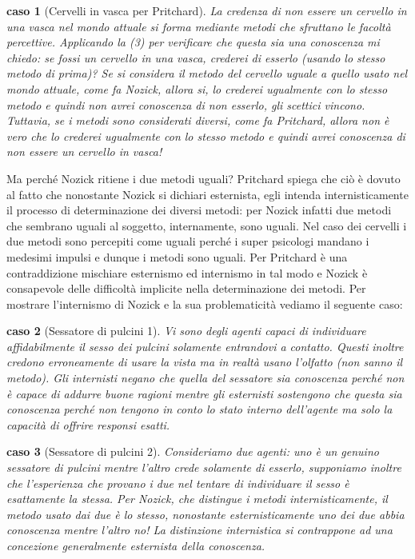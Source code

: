 \documentclass[10pt,a4paper]{article}
\newtheorem{caso}{caso}
\begin{document}
\begin{caso}[Cervelli in vasca per Pritchard]
	La credenza di non essere un cervello in una vasca nel mondo attuale si forma mediante metodi che sfruttano le facoltà percettive. Applicando la (3) per verificare che questa sia una conoscenza mi chiedo: se fossi un cervello in una vasca, crederei di esserlo (usando lo stesso metodo di prima)? Se si considera il metodo del cervello uguale a quello usato nel mondo attuale, come fa Nozick, allora si, lo crederei ugualmente con lo stesso metodo e quindi non avrei conoscenza di non esserlo, gli scettici vincono. Tuttavia, se i metodi sono considerati diversi, come fa Pritchard, allora non è vero che lo crederei ugualmente con lo stesso metodo e quindi avrei conoscenza di non essere un cervello in vasca!
\end{caso}
Ma perché Nozick ritiene i due metodi uguali? Pritchard spiega che ciò è dovuto al fatto che nonostante Nozick si dichiari esternista, egli intenda internisticamente il processo di determinazione dei diversi metodi: per Nozick infatti due metodi che sembrano uguali al soggetto, internamente, sono uguali. Nel caso dei cervelli i due metodi sono percepiti come uguali perché i super psicologi mandano i medesimi impulsi e dunque i metodi sono uguali. Per Pritchard è una contraddizione mischiare esternismo ed internismo in tal modo e Nozick è consapevole delle difficoltà implicite nella determinazione dei metodi. Per mostrare l'internismo di Nozick e la sua problematicità vediamo il seguente caso: 
\begin{caso}[Sessatore di pulcini 1]
	 Vi sono degli agenti capaci di individuare affidabilmente il sesso dei pulcini solamente entrandovi a contatto. Questi inoltre credono erroneamente di usare la vista ma in realtà usano l'olfatto (non sanno il metodo). Gli internisti negano che quella del sessatore sia conoscenza perché non è capace di addurre buone ragioni mentre gli esternisti sostengono che questa sia conoscenza perché non tengono in conto lo stato interno dell'agente ma solo la capacità di offrire responsi esatti.
\end{caso}  
\begin{caso}[Sessatore di pulcini 2]
	Consideriamo due agenti: uno è un genuino sessatore di pulcini mentre l'altro crede solamente di esserlo, supponiamo inoltre che l'esperienza che provano i due nel tentare di individuare il sesso è esattamente la stessa. Per Nozick, che distingue i metodi internisticamente, il metodo usato dai due è lo stesso, nonostante esternisticamente uno dei due abbia conoscenza mentre l'altro no! La distinzione internistica si contrappone ad una concezione generalmente esternista della conoscenza. 
\end{caso}
\end{document}
